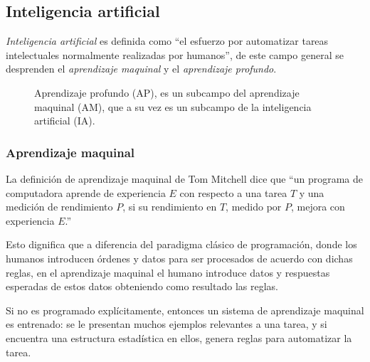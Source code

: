 \subsection {Inteligencia artificial}\label{subsec:intela}
\emph{Inteligencia artificial} es definida como ``el esfuerzo por automatizar tareas intelectuales normalmente realizadas por humanos''\cite{cho18}, de este campo general se desprenden el \emph{aprendizaje maquinal} y el \emph{aprendizaje profundo}.

\begin{figure}[H]\centering
{}
\caption{Aprendizaje profundo (AP), es un subcampo del aprendizaje maquinal (AM), que a su vez es un subcampo de la inteligencia artificial (IA)\cite{cho18}.}\label{fig:AI}
\end{figure}
\subsubsection {Aprendizaje maquinal}\label{subsec:machinel}
La definición de aprendizaje maquinal de Tom Mitchell\cite{mich19} dice que ``un programa de computadora aprende de experiencia $E$ con respecto a una tarea $T$ y una medición de rendimiento $P$, si su rendimiento en $T$, medido por $P$, mejora con experiencia $E$.''

Esto dignifica que a diferencia del paradigma clásico de programación, donde los humanos introducen órdenes y datos para ser procesados de acuerdo con dichas reglas, en el aprendizaje maquinal el humano introduce datos y respuestas esperadas de estos datos obteniendo como resultado las reglas.

Si no es programado explícitamente, entonces un sistema de aprendizaje maquinal es entrenado: se le presentan muchos ejemplos relevantes a una tarea, y si encuentra una estructura estadística en ellos, genera reglas para automatizar la tarea.

